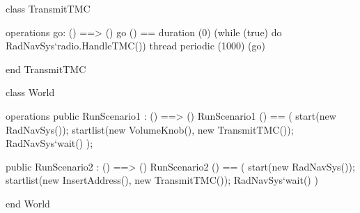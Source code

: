 \begin{vdm_al}
class TransmitTMC

operations
  go: () ==> ()
  go () ==
    duration (0)
      (while (true) do
        RadNavSys`radio.HandleTMC())
thread
  periodic (1000) (go)

end TransmitTMC
\end{vdm_al}

\begin{vdm_al}
class World

operations
  public RunScenario1 : () ==> ()
  RunScenario1 () ==
    ( start(new RadNavSys());
      startlist({new VolumeKnob(), new TransmitTMC()});
      RadNavSys`wait() );

  public RunScenario2 : () ==> ()
  RunScenario2 () ==
    ( start(new RadNavSys());
      startlist({new InsertAddress(), new TransmitTMC()});
      RadNavSys`wait() )

end World
\end{vdm_al}
